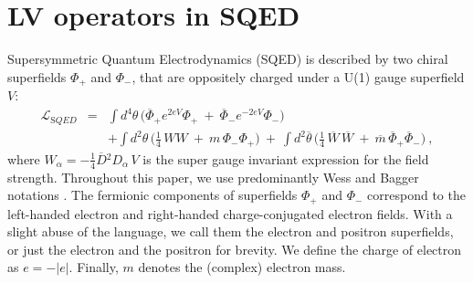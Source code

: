 \documentclass[12pt]{revtex4}
\begin{document}
\section{LV operators in SQED} 
\label{LVoperators}

Supersymmetric Quantum Electrodynamics (SQED) is described
by two chiral superfields $ \Phi_+ $ and $ \Phi_- $, that 
are oppositely charged under a U(1) gauge superfield $ V $: 
\begin{eqnarray}
\mathcal{L}_{\mathrm SQED} & =
&
\int d^4\theta\, \Big(
   \overline{\Phi}_+ e^{2eV} \Phi_+ ~+~
   \overline{\Phi}_- e^{-2eV} {\Phi}_-  \Big) \\
\label{SQED}
&& + 
\int d^2\theta\, \Big( \frac{1}{4}\,  WW ~+~m\, \Phi_-\Phi_+ \Big) ~+~
\int d^2\overline{\theta}\, 
\Big( \frac{1}{4}\, \overline{W}\,\overline{W} ~+~ 
\overline{m}\, \overline{\Phi}_+\overline{\Phi}_- \Big)~, 
\nonumber
\end{eqnarray}
where $ W_\alpha = - \frac{1}{4} \overline{D}{}^2 D_\alpha\, {V} $ 
is the super gauge invariant expression for the field strength. 
Throughout this paper, we use predominantly Wess and
Bagger notations \cite{Wess:1992cp}. The fermionic components of
superfields $ \Phi_+ $ and $ \Phi_- $ correspond to the left-handed
electron and right-handed charge-conjugated electron fields. With a   
slight abuse of the language, we call them the electron and positron 
superfields, or just the electron and the positron for brevity. We
define the charge of electron as $ e = - | e | $. 
Finally, $ m $ denotes the (complex) electron mass. 
\end{document}
